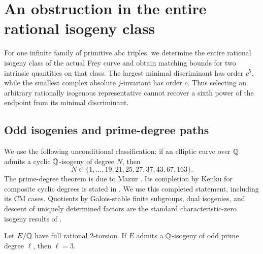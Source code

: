 \section{An obstruction in the entire rational isogeny class}
\label{sec:entire-rational-isogeny}

For one infinite family of primitive abc triples, we determine the
entire rational isogeny class of the actual Frey curve and obtain
matching bounds for two intrinsic quantities on that class. The largest
minimal discriminant has order $c^5$, while the smallest complex
absolute $j$-invariant has order $c$. Thus selecting an arbitrary
rationally isogenous representative cannot recover a sixth power of
the endpoint from its minimal discriminant.

\subsection{Odd isogenies and prime-degree paths}

We use the following unconditional classification:
if an elliptic curve over $\mathbb Q$ admits a cyclic $\mathbb Q$-isogeny of degree $N$,
then
\begin{equation}\label{eq:entire-cyclic-degrees}
 N\in\{1,\ldots,19,21,25,27,37,43,67,163\}.
\end{equation}
The prime-degree theorem is due to Mazur
\cite[Theorem~1]{MazurIsogenies1978}. Its completion by Kenku for
composite cyclic degrees is stated in
\cite[Theorem~2.2, p.~239]{BalakrishnanMazur2025}.
We use this completed statement, including its CM cases.
Quotients by Galois-stable finite subgroups, dual isogenies, and descent
of uniquely determined factors are the standard characteristic-zero
isogeny results of \cite[Chapter~III]{Silverman}.

\begin{proposition}\label{prop:entire-odd-prime}
Let $E/\mathbb Q$ have full rational $2$-torsion. If $E$ admits a
$\mathbb Q$-isogeny of odd prime degree $\ell$, then $\ell=3$.
\end{proposition}

